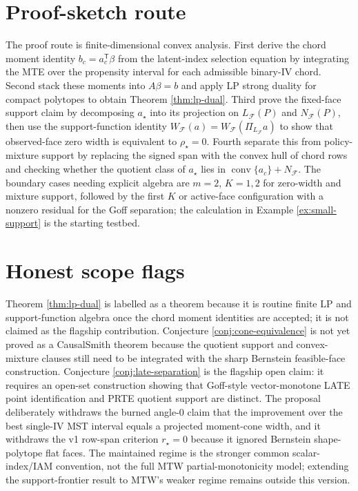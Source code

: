 \documentclass[11pt]{article}
\newcommand{\transpose}{\mathsf{T}}
\theoremstyle{definition}
\theoremstyle{plain}
\theoremstyle{remark}
\begin{document}
\section{Proof-sketch route}
The proof route is finite-dimensional convex analysis. First derive the chord moment identity \(b_c=a_c^\transpose\beta\) from the latent-index selection equation by integrating the MTE over the propensity interval for each admissible binary-IV chord. Second stack these moments into \(A\beta=b\) and apply LP strong duality for compact polytopes to obtain Theorem \ref{thm:lp-dual}. Third prove the fixed-face support claim by decomposing \(a_\star\) into its projection on \(L_{\mathcal F}(P)\) and \(N_{\mathcal F}(P)\), then use the support-function identity \(W_{\mathcal F}(a)=W_{\mathcal F}(\Pi_{L_{\mathcal F}}a)\) to show that observed-face zero width is equivalent to \(\rho_\star=0\). Fourth separate this from policy-mixture support by replacing the signed span with the convex hull of chord rows and checking whether the quotient class of \(a_\star\) lies in \(\operatorname{conv}\{a_c\}+N_{\mathcal F}\). The boundary cases needing explicit algebra are \(m=2\), \(K=1,2\) for zero-width and mixture support, followed by the first \(K\) or active-face configuration with a nonzero residual for the Goff separation; the calculation in Example \ref{ex:small-support} is the starting testbed.

\section{Honest scope flags}
Theorem \ref{thm:lp-dual} is labelled as a theorem because it is routine finite LP and support-function algebra once the chord moment identities are accepted; it is not claimed as the flagship contribution. Conjecture \ref{conj:cone-equivalence} is not yet proved as a CausalSmith theorem because the quotient support and convex-mixture clauses still need to be integrated with the sharp Bernstein feasible-face construction. Conjecture \ref{conj:late-separation} is the flagship open claim: it requires an open-set construction showing that Goff-style vector-monotone LATE point identification and PRTE quotient support are distinct. The proposal deliberately withdraws the burned angle-0 claim that the improvement over the best single-IV MST interval equals a projected moment-cone width, and it withdraws the v1 row-span criterion \(r_\star=0\) because it ignored Bernstein shape-polytope flat faces. The maintained regime is the stronger common scalar-index/IAM convention, not the full MTW partial-monotonicity model; extending the support-frontier result to MTW's weaker regime remains outside this version.
\end{document}
